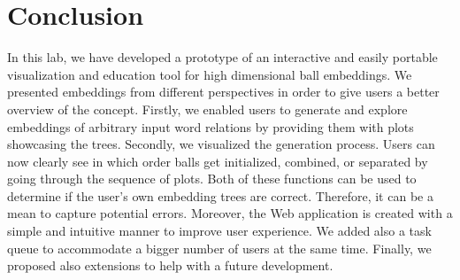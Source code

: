 \documentclass[]{article}
\begin{document}
\section{Conclusion}
In this lab, we have developed a prototype of an interactive and easily portable visualization and education tool for high dimensional ball embeddings. We presented embeddings from different perspectives in order to give users a better overview of the concept. Firstly, we enabled users to generate and explore embeddings of arbitrary input word relations by providing them with plots showcasing the trees. Secondly, we visualized the generation process. Users can now clearly see in which order balls get initialized, combined, or separated by going through the sequence of plots. Both of these functions can be used to determine if the user's own embedding trees are correct. Therefore, it can be a mean to capture potential errors. Moreover, the Web application is created with a simple and intuitive manner to improve user experience. We added also a task queue to accommodate a bigger number of users at the same time. Finally, we proposed also extensions to help with a future development. 

	
	
	
	 
\end{document}
